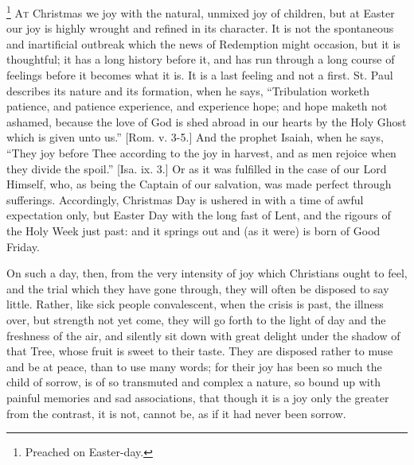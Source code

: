 \footnote{Preached on Easter-day.} A\textsc{t} Christmas we joy with the natural, unmixed joy of children, but
at Easter our joy is highly wrought and refined in its character. It is not the spontaneous and inartificial outbreak which the
news of Redemption might occasion, but it is thoughtful; it has a long
history before it, and has run through a long course of feelings
before it becomes what it is. It is a last feeling and not a first.
St. Paul describes its nature and its formation, when he says,
``Tribulation worketh patience, and patience experience, and
experience hope; and hope maketh not ashamed, because the love of God
is shed abroad in our hearts by the Holy Ghost which is given unto
us.'' [Rom. v. 3-5.] And the prophet Isaiah, when he says,
``They joy before Thee according to the joy in harvest, and as men
rejoice when they divide the spoil.'' [Isa. ix. 3.] Or as it was
fulfilled in the case of our Lord Himself, who, as being the Captain
of our salvation, was made perfect through sufferings. Accordingly,
Christmas Day is ushered in with a time of awful expectation only, but
Easter Day with the long fast of Lent, and the rigours of the Holy
Week just past: and it springs out and (as it were) is born of Good
Friday.

On such a day, then, from the very intensity of joy which
Christians ought to feel, and the trial which they have gone through,
they will often be disposed to say little. Rather, like sick people
convalescent, when the crisis is past, the illness over, but strength
not yet come, they will go forth to the light of day and the freshness
of the air, and silently sit down with great delight under the shadow
of that Tree, whose fruit is sweet to their taste. They are disposed
rather to muse and be at peace, than to use many words; for their joy
has been so much the child of sorrow, is of so transmuted and complex
a nature, so bound up with painful memories and sad associations, that
though it is a joy only the greater from the contrast, it is not,
cannot be, as if it had never been sorrow.

